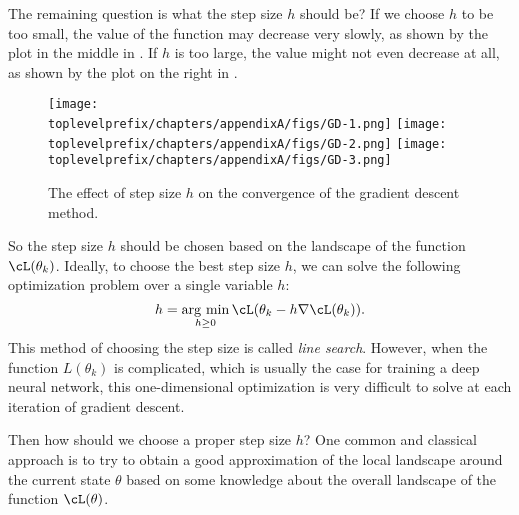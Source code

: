 \documentclass[../../book-main.tex]{subfiles}
\begin{document}
The remaining question is what the step size $h$ should be? If we choose $h$ to be too small, the value of the function may decrease very slowly, as shown by the plot in the middle in . If $h$ is too large, the value might not even decrease at all, as shown by the plot on the right in .

\begin{figure}[h]
    \centering
    \texttt{[image: \\toplevelprefix/chapters/appendixA/figs/GD-1.png]}
    \hspace{3mm}
    \texttt{[image: \\toplevelprefix/chapters/appendixA/figs/GD-2.png]}
    \hspace{3mm}
    \texttt{[image: \\toplevelprefix/chapters/appendixA/figs/GD-3.png]}
    \caption{The effect of step size $h$ on the convergence of the gradient descent method.}
    \label{fig:step-size}
\end{figure}

So the step size $h$ should be chosen based on the landscape of the function $\cL(\theta_k)$. Ideally, to choose the best step size $h$, we can solve the following optimization problem over a single variable $h$:
\begin{equation}
    h = \argmin_{h\geq 0} \cL(\theta_k - h\nabla \cL(\theta_k)).
\end{equation}
This method of choosing the step size is called \textit{line search}. However, when the function $L(\theta_k)$ is complicated, which is usually the case for training a deep neural network, this one-dimensional optimization is very difficult to solve at each iteration of gradient descent. 

Then how should we choose a proper step size $h$? One common and classical approach is to try to obtain a good approximation of the local landscape around the current state $\theta$ based on some knowledge about the overall landscape of the function $\cL(\theta)$. 
\end{document}
